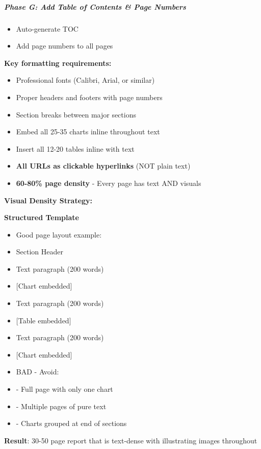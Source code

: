 \documentclass[11pt]{article}
\begin{document}
\subparagraph{Phase G: Add Table of Contents \& Page Numbers}\mbox{}\par
\begin{itemize}[leftmargin=*,itemsep=2pt,topsep=2pt]
\item {} Auto-generate TOC
\item {} Add page numbers to all pages
\end{itemize}

\textbf{Key formatting requirements:}

\begin{itemize}[leftmargin=*,itemsep=2pt,topsep=2pt]
\item {} Professional fonts (Calibri, Arial, or similar)
\item {} Proper headers and footers with page numbers
\item {} Section breaks between major sections
\item {} Embed all 25-35 charts inline throughout text
\item {} Insert all 12-20 tables inline with text
\item {} \textbf{All URLs as clickable hyperlinks} (NOT plain text)
\item {} \textbf{60-80\% page density} - Every page has text AND visuals
\end{itemize}

\textbf{Visual Density Strategy:}

\textbf{Structured Template}
\begin{itemize}[leftmargin=*,itemsep=2pt,topsep=2pt]
\item {} Good page layout example:
\item {} Section Header
\item {} Text paragraph (200 words)
\item {} [Chart embedded]
\item {} Text paragraph (200 words)
\item {} [Table embedded]
\item {} Text paragraph (200 words)
\item {} [Chart embedded]
\item {} BAD - Avoid:
\item {} - Full page with only one chart
\item {} - Multiple pages of pure text
\item {} - Charts grouped at end of sections
\end{itemize}

\textbf{Result}: 30-50 page report that is text-dense with illustrating images throughout
\end{document}
